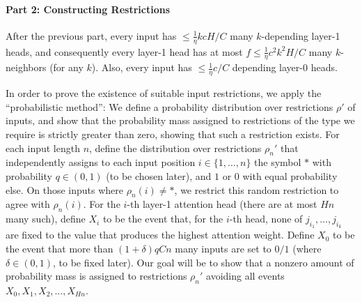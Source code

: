 \documentclass[11pt,a4paper]{article}
\begin{document}


\paragraph{Part 2: Constructing Restrictions}
After the previous part, every input has $\leq \frac{1}{\eta}kcH/C$ many $k$-depending layer-1 heads, and consequently every layer-1 head has at most $f \leq \frac{1}{\eta}c^2k^2H/C$ many $k$-neighbors (for any $k$).
Also, every input has $\leq \frac{1}{\eta}c/C$ depending layer-0 heads.


In order to prove the existence of suitable input restrictions, we apply the ``probabilistic method'': We define a probability distribution over restrictions $\rho'$ of inputs, and show that the probability mass assigned to restrictions of the type we require is strictly greater than zero, showing that such a restriction exists.
For each input length $n$, define the distribution over restrictions $\rho_n'$ that independently assigns to each input position $i \in \{1, \dots, n\}$ the symbol $*$ with probability $q \in (0,1)$ (to be chosen later), and $1$ or $0$ with equal probability else.
On those inputs where $\rho_n(i) \neq *$, we restrict this random restriction to agree with $\rho_n(i)$.
For the $i$-th layer-1 attention head (there are at most $Hn$ many such), define $X_i$ to be the event that, for the $i$-th head, none of $j_{i_1}, \dots, j_{i_k}$ are fixed to the value that produces the highest attention weight. %
Define $X_0$ to be the event that more than $(1+\delta)qCn$ many inputs are set to $0/1$ (where $\delta \in (0,1)$, to be fixed later).
Our goal will be to show that a nonzero amount of probability mass is assigned to restrictions $\rho_n'$ avoiding all events $X_0, X_1, X_2, \dots, X_{Hn}$.
\end{document}
